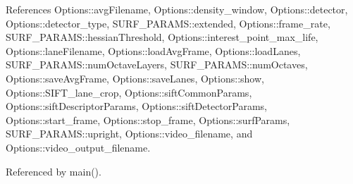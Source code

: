 \-References \-Options\-::avg\-Filename, \-Options\-::density\-\_\-window, \-Options\-::detector, \-Options\-::detector\-\_\-type, \-S\-U\-R\-F\-\_\-\-P\-A\-R\-A\-M\-S\-::extended, \-Options\-::frame\-\_\-rate, \-S\-U\-R\-F\-\_\-\-P\-A\-R\-A\-M\-S\-::hessian\-Threshold, \-Options\-::interest\-\_\-point\-\_\-max\-\_\-life, \-Options\-::lane\-Filename, \-Options\-::load\-Avg\-Frame, \-Options\-::load\-Lanes, \-S\-U\-R\-F\-\_\-\-P\-A\-R\-A\-M\-S\-::num\-Octave\-Layers, \-S\-U\-R\-F\-\_\-\-P\-A\-R\-A\-M\-S\-::num\-Octaves, \-Options\-::save\-Avg\-Frame, \-Options\-::save\-Lanes, \-Options\-::show, \-Options\-::\-S\-I\-F\-T\-\_\-lane\-\_\-crop, \-Options\-::sift\-Common\-Params, \-Options\-::sift\-Descriptor\-Params, \-Options\-::sift\-Detector\-Params, \-Options\-::start\-\_\-frame, \-Options\-::stop\-\_\-frame, \-Options\-::surf\-Params, \-S\-U\-R\-F\-\_\-\-P\-A\-R\-A\-M\-S\-::upright, \-Options\-::video\-\_\-filename, and \-Options\-::video\-\_\-output\-\_\-filename.



\-Referenced by main().


